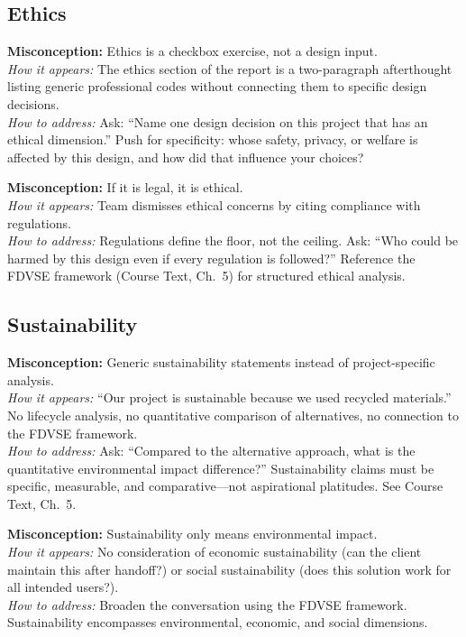 \subsection{Ethics}

\begin{redflag}
\textbf{Misconception:} Ethics is a checkbox exercise, not a design input.\\
\textit{How it appears:} The ethics section of the report is a two-paragraph afterthought listing generic professional codes without connecting them to specific design decisions.\\
\textit{How to address:} Ask: ``Name one design decision on this project that has an ethical dimension.'' Push for specificity: whose safety, privacy, or welfare is affected by this design, and how did that influence your choices?
\end{redflag}

\begin{redflag}
\textbf{Misconception:} If it is legal, it is ethical.\\
\textit{How it appears:} Team dismisses ethical concerns by citing compliance with regulations.\\
\textit{How to address:} Regulations define the floor, not the ceiling. Ask: ``Who could be harmed by this design even if every regulation is followed?'' Reference the FDVSE framework (Course Text, Ch.~5) for structured ethical analysis.
\end{redflag}

\subsection{Sustainability}

\begin{redflag}
\textbf{Misconception:} Generic sustainability statements instead of project-specific analysis.\\
\textit{How it appears:} ``Our project is sustainable because we used recycled materials.'' No lifecycle analysis, no quantitative comparison of alternatives, no connection to the FDVSE framework.\\
\textit{How to address:} Ask: ``Compared to the alternative approach, what is the quantitative environmental impact difference?'' Sustainability claims must be specific, measurable, and comparative---not aspirational platitudes. See Course Text, Ch.~5.
\end{redflag}

\begin{redflag}
\textbf{Misconception:} Sustainability only means environmental impact.\\
\textit{How it appears:} No consideration of economic sustainability (can the client maintain this after handoff?) or social sustainability (does this solution work for all intended users?).\\
\textit{How to address:} Broaden the conversation using the FDVSE framework. Sustainability encompasses environmental, economic, and social dimensions.
\end{redflag}


